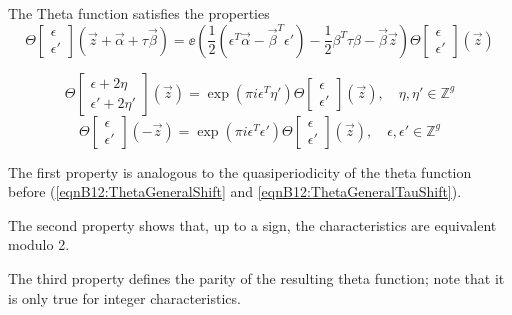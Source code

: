 \begin{lemma}
    The Theta function satisfies the properties
    \begin{equation}\Theta\begin{bmatrix}\epsilon \\ \epsilon'\end{bmatrix}(\vec z + \vec \alpha + \tau \vec \beta) =
    \ee\left(\frac{1}{2}(\epsilon^T \vec \alpha - \vec \beta^T \epsilon') - \frac{1}{2} \beta^T \tau \beta - \vec \beta \vec z\right)
    \Theta\begin{bmatrix}\epsilon \\ \epsilon'\end{bmatrix}(\vec z)
    \end{equation}

    \begin{equation}\Theta\begin{bmatrix}\epsilon + 2\eta \\ \epsilon' + 2\eta' \end{bmatrix}(\vec z) = \exp(\pi i \epsilon^T \eta')
    \Theta\begin{bmatrix}\epsilon \\ \epsilon'\end{bmatrix}(\vec z) , \quad \eta,\eta' \in \mathbb Z^g\end{equation}
    \begin{equation}\Theta\begin{bmatrix}\epsilon \\ \epsilon'\end{bmatrix}(-\vec z) = \exp(\pi i \epsilon^T \epsilon') \Theta\begin{bmatrix}\epsilon \\ \epsilon'\end{bmatrix}(\vec z) , \quad \epsilon,\epsilon' \in \mathbb Z^g\end{equation}

    The first property is analogous to the quasiperiodicity of the theta function before (\ref{eqnB12:ThetaGeneralShift} and \ref{eqnB12:ThetaGeneralTauShift}).
    
    The second property shows that, up to a sign, the characteristics are equivalent modulo 2.
    
    The third property defines the parity of the resulting theta function; note that it is only true for integer characteristics.
\end{lemma}

